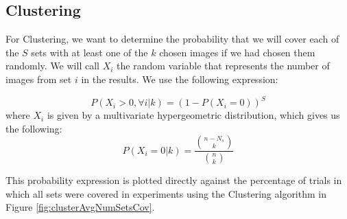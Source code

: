 
\subsection{Clustering}
For Clustering, we want to determine the probability that we will cover each of the $S$ sets with at least one of the $k$ chosen images if we had chosen them randomly.  We will call $X_i$ the random variable that represents the number of images from set $i$ in the results.  We use the following expression:

\begin{equation}
	P( X_i > 0 , \forall i | k) = (1 - P(X_i = 0))^{S}
\end{equation}
where $X_i$ is given by a multivariate hypergeometric distribution, which gives us the following:
\begin{equation}
	P(X_i = 0 | k) = \frac{{n-N_s \choose k}}{{n \choose k}}
\end{equation}

This probability expression is plotted directly against the percentage of trials in which all sets were covered in experiments using the Clustering algorithm in Figure \ref{fig:clusterAvgNumSetsCov}.


